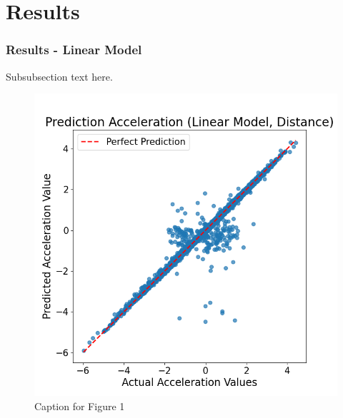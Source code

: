 \section{Results}

\subsubsection{Results - Linear Model}
Subsubsection text here.
\begin{figure}[t]
    \centering
    \begin{minipage}[b]{0.45\columnwidth}
        \centering
        \includegraphics[width=\columnwidth]{images/figures/Prediction Acceleration (Linear Model, Distance).png}
        \caption{Caption for Figure 1}
        \label{fig:minipage3}
    \end{minipage}
    \hfill
    \begin{minipage}[b]{0.45\columnwidth}
        \centering

\end{minipage}
\end{figure}
